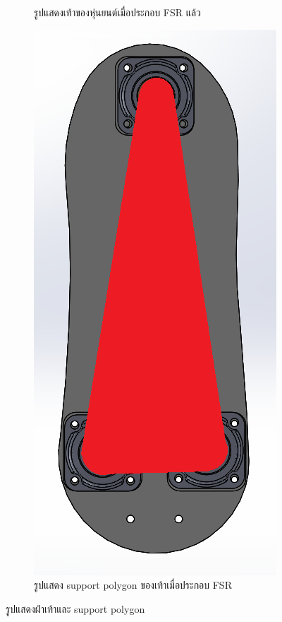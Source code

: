 \begin{figure}[h!]
\begin{subfigure}[b]{0.3\linewidth}
    \caption{รูปแสดงเท้าของหุ่นยนต์เมื่อประกอบ FSR แล้ว}
  \end{subfigure}
  \begin{subfigure}[b]{0.3\linewidth}
    \includegraphics[width=\linewidth]{chapter4/images/foot+FSR_sp.PNG}
    \caption{รูปแสดง support polygon ของเท้าเมื่อประกอบ FSR}
  \end{subfigure}
  \caption{รูปแสดงฝ่าเท้าและ support polygon}
  \label{fig:foot_FSR}
\end{figure}

